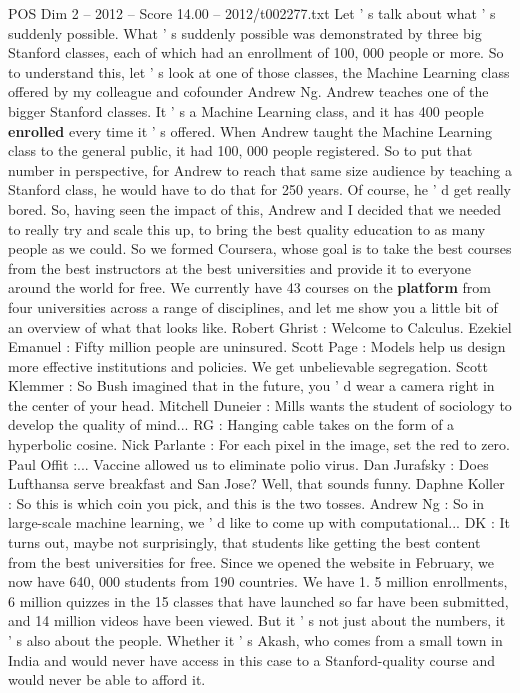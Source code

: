 \begin{textsample}{POS Dim 2 – 2012 – Score 14.00 – 2012/t002277.txt}
Let ' s talk about what ' s suddenly possible.
What ' s suddenly possible was demonstrated by three big Stanford classes, each of which had an enrollment of 100, 000 people or more.
So to understand this, let ' s look at one of those classes, the Machine Learning class offered by my colleague and cofounder Andrew Ng.
Andrew teaches one of the bigger Stanford classes.
It ' s a Machine Learning class, and it has 400 people \textbf{enrolled} every time it ' s offered.
When Andrew taught the Machine Learning class to the general public, it had 100, 000 people registered.
So to put that number in perspective, for Andrew to reach that same size audience by teaching a Stanford class, he would have to do that for 250 years.
Of course, he ' d get really bored.
So, having seen the impact of this, Andrew and I decided that we needed to really try and scale this up, to bring the best quality education to as many people as we could.
So we formed Coursera, whose goal is to take the best courses from the best instructors at the best universities and provide it to everyone around the world for free.
We currently have 43 courses on the \textbf{platform} from four universities across a range of disciplines, and let me show you a little bit of an overview of what that looks like.
Robert Ghrist : Welcome to Calculus.
Ezekiel Emanuel : Fifty million people are uninsured.
Scott Page : Models help us design more effective institutions and policies.
We get unbelievable segregation.
Scott Klemmer : So Bush imagined that in the future, you ' d wear a camera right in the center of your head.
Mitchell Duneier : Mills wants the student of sociology to develop the quality of mind...
RG : Hanging cable takes on the form of a hyperbolic cosine.
Nick Parlante : For each pixel in the image, set the red to zero.
Paul Offit :...
Vaccine allowed us to eliminate polio virus.
Dan Jurafsky : Does Lufthansa serve breakfast and San Jose?
Well, that sounds funny.
Daphne Koller : So this is which coin you pick, and this is the two tosses.
Andrew Ng : So in large-scale machine learning, we ' d like to come up with computational...
DK : It turns out, maybe not surprisingly, that students like getting the best content from the best universities for free.
Since we opened the website in February, we now have 640, 000 students from 190 countries.
We have 1. 5 million enrollments, 6 million quizzes in the 15 classes that have launched so far have been submitted, and 14 million videos have been viewed.
But it ' s not just about the numbers, it ' s also about the people.
Whether it ' s Akash, who comes from a small town in India and would never have access in this case to a Stanford-quality course and would never be able to afford it.

\end{textsample}
